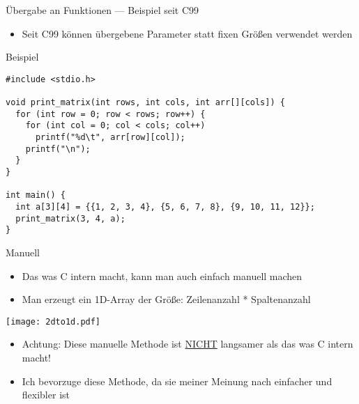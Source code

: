 \documentclass[presentation]{beamer}
\begin{document}
\begin{frame}[label={sec:org799dcb9},fragile]{Übergabe an Funktionen --- Beispiel seit C99}
 \begin{itemize}
\item Seit C99 können übergebene Parameter statt fixen Größen verwendet
werden
\end{itemize}
\begin{block}{Beispiel}
\begin{verbatim}
#include <stdio.h>

void print_matrix(int rows, int cols, int arr[][cols]) {
  for (int row = 0; row < rows; row++) {
    for (int col = 0; col < cols; col++)
      printf("%d\t", arr[row][col]);
    printf("\n");
  }
}

int main() {
  int a[3][4] = {{1, 2, 3, 4}, {5, 6, 7, 8}, {9, 10, 11, 12}};
  print_matrix(3, 4, a);
}
\end{verbatim}
\end{block}
\end{frame}

\begin{frame}[label={sec:org1e61dfc}]{Manuell}
\begin{itemize}
\item Das was C intern macht, kann man auch einfach manuell machen
\item Man erzeugt ein 1D-Array der Größe: \alert{Zeilenanzahl * Spaltenanzahl}
\end{itemize}
\begin{center}
\texttt{[image: 2dto1d.pdf]}
\end{center} 
\begin{itemize}
\item \alert{Achtung: Diese manuelle Methode ist \uline{NICHT} langsamer als das was C intern macht!}
\item Ich bevorzuge diese Methode, da sie meiner Meinung nach \alert{einfacher
und flexibler} ist
\end{itemize}
\end{frame}
\end{document}
